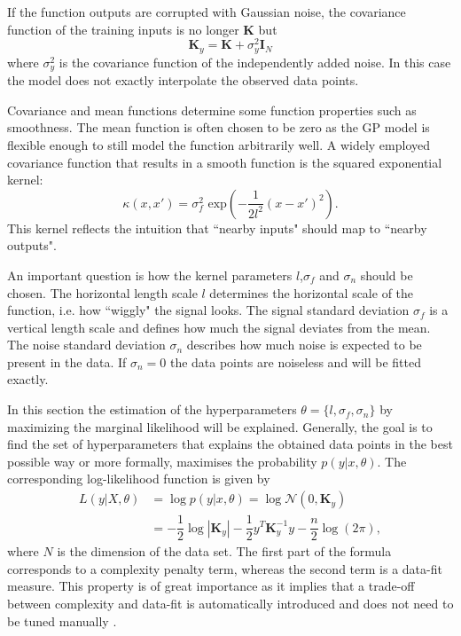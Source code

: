 \documentclass[../main.tex]{subfiles}
\begin{document}
If the function outputs are corrupted with Gaussian noise, the covariance function of the training inputs is no longer $\mathbf{K}$ but
\begin{equation}
    \mathbf{K}_y = \mathbf{K} + \sigma_y^2\mathbf{I}_N
\end{equation}
where $\sigma_y^2$ is the covariance function of the independently added noise. In this case the model does not exactly interpolate the observed data points.\par
Covariance and mean functions determine some function properties such as smoothness. The mean function is often chosen to be zero as the GP model is flexible enough to still model the function arbitrarily well. A widely employed covariance function that results in a smooth function is the squared exponential kernel:
\begin{equation}\label{eq:sqexp}
    \kappa(x,x') = \sigma^2_f \text{ exp}(-\dfrac{1}{2l^2}(x-x')^2).
\end{equation}
This kernel reflects the intuition that ``nearby inputs" should map to ``nearby outputs". \par 
An important question is how the kernel parameters $l$,$\sigma_f$ and $\sigma_n$ should be chosen. The horizontal length scale $l$ determines the horizontal scale of the function, i.e. how ``wiggly" the signal looks. The signal standard deviation $\sigma_f$ is a vertical length scale and defines how much the signal deviates from the mean. The noise standard deviation $\sigma_n$ describes how much noise is expected to be present in the data. If $\sigma_n = 0$ the data points are noiseless and will be fitted exactly. \par
In this section the estimation of the hyperparameters $\theta = \{l,\sigma_f, \sigma_n\}$ by maximizing the marginal likelihood will be explained. Generally, the goal is to find the set of hyperparameters that explains the obtained data points in the best possible way or more formally, maximises the probability $p(y|x,\theta)$. The corresponding log-likelihood function is given by
\begin{align}
    L(y|X, \theta) &= \log p(y|x,\theta) = \log \mathcal{N}(0,\mathbf{K}_y)\\
    &= -\dfrac{1}{2} \log|\mathbf{K}_y|-\dfrac{1}{2}y^T\mathbf{K}_y^{-1}y-\dfrac{n}{2}\log(2\pi),
\end{align}
where $N$ is the dimension of the data set. The first part of the formula corresponds to a complexity penalty term, whereas the second term is a data-fit measure. This property is of great importance as it implies that a trade-off between complexity and data-fit is automatically introduced and does not need to be tuned manually \cite{rasmussen2006gaussian}. 
\end{document}
